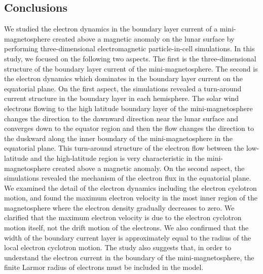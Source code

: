 \documentclass[draft,jgrga]{agutex2015}
\begin{document}
\begin{article}
\section{Conclusions}
We studied the electron dynamics in the boundary layer current of 
a mini-magnetosphere created above a magnetic anomaly on the lunar surface 
by performing three-dimensional electromagnetic particle-in-cell simulations.
In this study, we focused on the following two aspects.
The first is the three-dimensional structure of 
the boundary layer current of the mini-magnetosphere. 
The second is the electron dynamics which dominates 
in the boundary layer current on the equatorial plane.
On the first aspect,
the simulations revealed  a turn-around current structure in the boundary layer in each hemisphere.
The solar wind electrons flowing 
to the high latitude boundary layer of the mini-magnetosphere
changes the direction to the dawnward direction 
near the lunar surface and converges down to the equator region 
and then the flow changes the direction to the duskward
along the inner boundary of the mini-magnetosphere in the equatorial plane.
This turn-around structure of the electron flow 
between the low-latitude and the high-latitude region is 
very characteristic in the mini-magnetosphere created above a magnetic anomaly.
On the second aspect,
the simulations revealed the mechanism of the electron flux in the equatorial plane. 
We examined the detail of the electron dynamics including the electron cyclotron motion,
and found the maximum electron velocity in the most inner region of 
the magnetosphere where the electron density gradually decreases to zero.
We clarified that the maximum electron velocity
is due to the electron cyclotron motion itself, 
not the drift motion of the electrons.
We also confirmed that the width of the boundary current layer 
is approximately equal to the radius of the local electron cyclotron motion.
The study also suggests that, in order to understand the electron current in the boundary of the mini-magnetosphere, 
 the finite Larmor radius of electrons must be included in the model.


\end{article}
\end{document}
